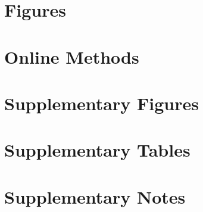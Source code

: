\documentclass[11pt]{article}
\begin{document}

\maketitle









\printbibliography

\clearpage
\section*{Figures}

\FloatBarrier

\clearpage
\section*{Online Methods}

\FloatBarrier

\clearpage
\section*{Supplementary Figures}

\FloatBarrier

\clearpage
\section*{Supplementary Tables}

\FloatBarrier

\clearpage
\section*{Supplementary Notes}

\FloatBarrier

\clearpage
\end{document}
